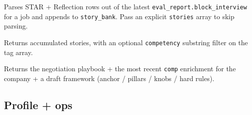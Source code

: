 \documentclass[11pt,letterpaper]{article}
\newcommand{\tool}[1]{\texttt{#1}}
\begin{document}
\begin{description}[leftmargin=0pt]
\item[\tool{extract\_stories}] Parses STAR + Reflection rows out of the latest \texttt{eval\_report.block\_interview} for a job and appends to \tool{story\_bank}. Pass an explicit \texttt{stories} array to skip parsing.
\item[\tool{get\_story\_bank}] Returns accumulated stories, with an optional \texttt{competency} substring filter on the tag array.
\item[\tool{negotiation\_brief}] Returns the negotiation playbook + the most recent \texttt{comp} enrichment for the company + a draft framework (anchor / pillars / knobs / hard rules).
\end{description}

\subsection*{Profile + ops}
\end{document}
